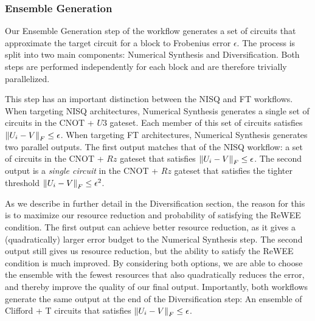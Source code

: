 \subsubsection*{Ensemble Generation}
Our Ensemble Generation step of the workflow generates a set of circuits that approximate the target circuit for a block to Frobenius error $\epsilon$. The process is split into two main components: Numerical Synthesis and Diversification. Both steps are performed independently for each block and are therefore trivially parallelized. 

This step has an important distinction between the NISQ and FT workflows. When targeting NISQ architectures, Numerical Synthesis generates a single set of circuits in the CNOT + $U3$ gateset. Each member of this set of circuits satisfies $\left\lVert U_i-V \right\rVert_F\leq \epsilon$. When targeting FT architectures, Numerical Synthesis generates two parallel outputs. The first output matches that of the NISQ workflow: a set of circuits in the CNOT + $Rz$ gateset that satisfies $\left\lVert U_i-V \right\rVert_F\leq \epsilon$.  The second output is a \emph{single circuit} in the CNOT + $Rz$ gateset that satisfies the tighter threshold $\left\lVert U_i-V \right\rVert_F\leq \epsilon ^2$. 

As we describe in further detail in the Diversification section, the reason for this is to maximize our resource reduction and probability of satisfying the ReWEE condition. The first output can achieve better resource reduction, as it gives a (quadratically) larger error budget to the Numerical Synthesis step. The second output still gives us resource reduction, but the ability to satisfy the ReWEE condition is much improved. By considering both options, we are able to choose the ensemble with the fewest resources that also quadratically reduces the error, and thereby improve the quality of our final output. Importantly, both workflows generate the same output at the end of the Diversification step: An ensemble of Clifford + T circuits that satisfies $\left\lVert U_i-V \right\rVert_F\leq \epsilon$.

